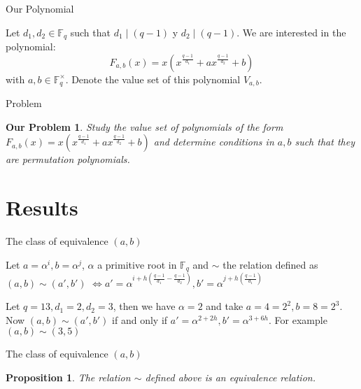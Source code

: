 \documentclass{beamer}
\newtheorem{proposition}{Proposition}
\newtheorem{ourproblem}{Our Problem}
\begin{document}
\begin{frame}{Our Polynomial}
  

  Let $d_1, d_2 \in \mathbb{F}_q$ such that $d_1 \mid (q-1)$ y $d_2 \mid (q-1)$. We are interested in the polynomial:
  {\Large$$F_{a,b}(x) = x(x^{\frac{q-1}{d_1}} + ax^{\frac{q-1}{d_2}} +b)$$ }
  with $a,b \in \mathbb{F}_q^{\times}$. 
  \pause 
  \linebreak
  Denote the value set of this polynomial $V_{a,b}$.

\end{frame}

\begin{frame}{Problem}
  \begin{ourproblem}
    Study the value set of polynomials of the form $F_{a,b}(x) = x(x^{\frac{q-1}{d_1}} + ax^{\frac{q-1}{d_2}} +b)$ and determine conditions in $a,b$ such that they are permutation polynomials.
  \end{ourproblem}
\end{frame}

\section{Results} %
\label{sec:results}

\begin{frame}{The class of equivalence $(a,b)$}
  
  Let $a = \alpha^i, b = \alpha^j$, $\alpha$ a primitive root in $\mathbb{F}_q$ and $\sim$ the relation defined as $(a,b) \sim (a', b')$ 
  $\Longleftrightarrow a' = \alpha^{i+h(\frac{q-1}{d_1} - \frac{q-1}{d_2})}, b' = \alpha^{j+h(\frac{q-1}{d_1})}$

  \begin{example}
    Let $q = 13, d_1 = 2, d_2 = 3$, then we have $\alpha = 2$ and take $a = 4 = 2^2, b = 8 = 2^3$. Now $(a,b) \sim (a',b')$ if and only if
    $a' = \alpha^{2+2h}, b' = \alpha^{3+6h}$. For example $(a,b) \sim (3,5)$
  \end{example}

\end{frame}

\begin{frame}{The class of equivalence $(a,b)$}
  
  \begin{proposition}
    The relation $\sim$ defined above is an equivalence relation.
  \end{proposition}

\end{frame}
\end{document}
